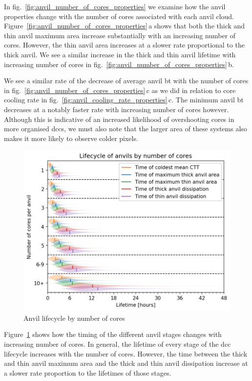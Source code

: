 In fig.~\ref{fig:anvil_number_of_cores_properties} we examine how the anvil properties change with the number of cores associated with each anvil cloud.
Figure~\ref{fig:anvil_number_of_cores_properties}\,a shows that both the thick and thin anvil maximum area increase substantially with an increasing number of cores.
However, the thin anvil area increases at a slower rate proportional to the thick anvil.
We see a similar increase in the thick and thin anvil lifetime with increasing number of cores in fig.~\ref{fig:anvil_number_of_cores_properties}\,b.

We see a similar rate of the decrease of average anvil \acrshort{bt} with the number of cores in fig.~\ref{fig:anvil_number_of_cores_properties}\,c as we did in relation to core cooling rate in fig.~\ref{fig:anvil_cooling_rate_properties}\,c.
The minimum anvil \acrshort{bt} decreases at a notably faster rate with increasing number of cores however.
Although this is indicative of an increased likelihood of overshooting cores in more organised \acrshort{dcc}s, we must also note that the larger area of these systems also makes it more likely to observe colder pixels.

\begin{figure}[tp]
    \centering
    \includegraphics[width=\textwidth]{figures/ch2_25.png}
    \caption{Anvil lifecycle by number of cores}
    \label{fig:anvil_number_of_cores_lifecycle}
\end{figure}

Figure~\ref{fig:anvil_number_of_cores_lifecycle} shows how the timing of the different anvil stages changes with increasing number of cores.
In general, the lifetime of every stage of the \acrshort{dcc} lifecycle increases with the number of cores.
However, the time between the thick and thin anvil maximum area and the thick and thin anvil dissipation increase at a slower rate proportion to the lifetimes of those stages.

